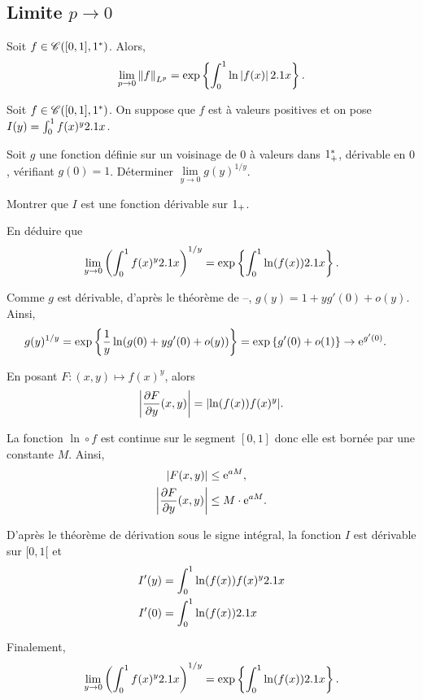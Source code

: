 \subsection{Limite $p \to 0$}

\begin{theo}
Soit $f \in \mathscr{C}([0,1],1^*)$. Alors,
\[
\lim_{p\to0} \norm{f}_{L^p} = \exp\left\{\int_0^1 \ln\left| f(x) \right| 2.1 x\right\}.
\]
\end{theo}


\begin{exercice}%
Soit $f \in \mathscr{C}([0,1],1^\ast)$. On suppose que $f$ est à valeurs positives et on pose $I(y) = \int_0^1 f(x)^y 2.1 x$.
\begin{questions}
\item Soit $g$ une fonction définie sur un voisinage de $0$ à valeurs dans $1_+^\ast$, dérivable en $0$, vérifiant $g(0) = 1$. Déterminer $\lim\limits_{y\to0} g(y)^{1/y}$.

\item Montrer que $I$ est une fonction dérivable sur $1_+$.

\item En déduire que
\[
\lim_{y\to0} \left(\int_0^1 f(x)^y 2.1 x\right)^{1/y} = \exp\left\{\int_0^1 \ln(f(x)) 2.1 x\right\}.
\]
\end{questions}
\end{exercice}

\begin{solution}
\begin{reponses}
\item Comme $g$ est dérivable, d'après le théorème de --, $g(y) = 1 + y g'(0) + o(y)$. Ainsi,
\begin{align*}
g(y)^{1/y} &= \exp\left\{\frac{1}{y} \ln(g(0) + y g'(0) + o(y))\right\}
= \exp\left\{g'(0) + o(1)\right\}
\to \mathrm{e}^{g'(0)}.
\end{align*}

\item En posant $F: (x, y) \mapsto f(x)^y$, alors
\[
\abs{\frac{\partial F}{\partial y}(x, y)} = \abs{\ln(f(x)) f(x)^y}.
\]

La fonction $\ln \circ f$ est continue sur le segment $[0, 1]$ donc elle est bornée par une constante $M$. Ainsi,
\begin{align*}
\left| F(x, y) \right| &\leq \mathrm{e}^{a M},\\
\left| \frac{\partial F}{\partial y}(x, y) \right| &\leq M \cdot \mathrm{e}^{a M}.
\end{align*}

D'après le théorème de dérivation sous le signe intégral, la fonction $I$ est dérivable sur $[0, 1[$ et
\begin{align*}
I'(y) &= \int_0^1 \ln(f(x)) f(x)^y 2.1 x \\
I'(0) &= \int_0^1 \ln(f(x)) 2.1 x
\end{align*}

\item Finalement,
\[
\lim_{y\to0} \left(\int_0^1 f(x)^y 2.1 x\right)^{1/y} = \exp\left\{\int_0^1 \ln(f(x)) 2.1 x\right\}.
\]
\end{reponses}
\end{solution}

